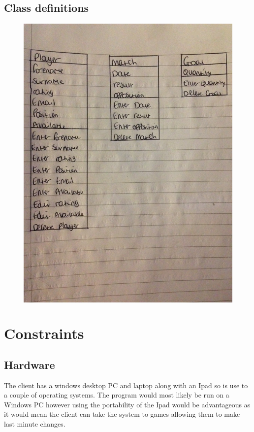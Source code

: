 \subsection{Class definitions}
\begin{figure}[H]
	\includegraphics[width=150mm]{classdef}
\end{figure}


\section{Constraints}

\subsection{Hardware}
The client has a windows desktop PC and laptop along with an Ipad so is use to a couple of operating systems. The program would most likely be run on a Windows PC however using the portability of the Ipad would be advantageous as it would mean the client can take the system to games allowing them to make last minute changes.
